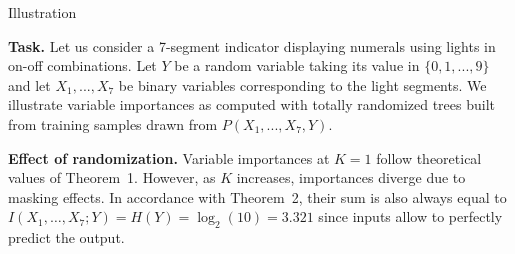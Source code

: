 \documentclass[final]{beamer}
\begin{document}
\begin{frame}{}
\begin{textblock}{0.32}
\begin{block}{Illustration \phantom{p}}
\begin{minipage}{\linewidth}
    \begin{figure}
      \begin{center}
        \vspace{-0.5cm}
      \end{center}
    \end{figure}
    \textbf{Task.} Let us consider a 7-segment indicator displaying numerals
    using lights in on-off combinations. Let $Y$ be a random variable taking its value in $\{0, 1, ..., 9\}$
    and let $X_1, ..., X_7$ be binary variables corresponding to the light segments. We illustrate
    variable importances as computed with totally randomized trees built
    from training samples drawn from $P(X_1, ..., X_7, Y)$.
\end{minipage}

\vspace{0.3cm}

\textbf{Effect of randomization.} Variable importances at $K=1$ follow
theoretical values of Theorem~1. However, as $K$ increases,  importances diverge due
to masking effects. In accordance with Theorem~2, their sum is also always
equal to $I(X_{1}, \ldots, X_{7}; Y) = H(Y) = \log_{2}(10)= 3.321$ since inputs
allow to perfectly predict the output.


\end{block}
\end{textblock}
\end{frame}
\end{document}
